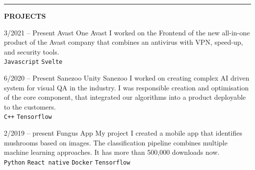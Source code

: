 \documentclass[10pt,A4]{article}
\newcommand{\cvsection}[2] {
\textcolor{sectcol}{\uppercase{\textbf{#1}}}
}
\newcommand{\cvsect}[4]{
	\textcolor{#3}{\hrule}
	\colorbox{#3}{ {\cvsection{#1}{#4}}}
}
\begin{document}
	\cvsect{Projects}{0.49}{thirdcol}{textcol}\\[20pt]
	\begin{entrylist}
		\entry
			{3/2021 -- Present}
			{Avast One}
			{Avast}
			{ I worked on the Frontend of the new all-in-one product of the Avast company that combines an antivirus with VPN, speed-up, and security tools.
				\\ 
				\texttt{Javascript}\slashsep
				\texttt{Svelte}
			}

		\entry
				{6/2020 -- Present}
				{Sanezoo Unity}
				{Sanezoo}
				{I worked on creating complex AI driven system for visual QA in the industry. 
					I was responsible creation and optimisation of the core component, that integrated our algorithms into a product deployable to the customers. 
					\\ 
					\texttt{C++}\slashsep
					\texttt{Tensorflow}
				}

		\entry
			{2/2019 -- present}
			{Fungus App}
			{My project}
			{I created a mobile app that identifies mushrooms based on
				images. The classification pipeline combines multiple machine learning approaches. 
				It has more than 500,000 downloads now.
				\\ 
				\texttt{Python}\slashsep
				\texttt{React native}\slashsep
				\texttt{Docker}\slashsep
				\texttt{Tensorflow}}
		


\end{entrylist}
\end{document}
